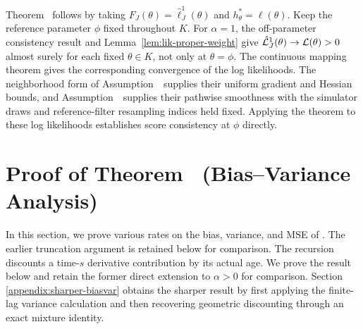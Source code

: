 Theorem~{\thmMopGradConsistency} follows by taking $F_J(\theta)=\hat\ell_J^1(\theta)$ and $h_\theta^*=\ell(\theta)$. Keep the reference parameter $\phi$ fixed throughout $K$. For $\alpha=1$, the off-parameter consistency result and Lemma~\ref{lem:lik-proper-weight} give $\hat{\mathcal{L}}_J^1(\theta)\to\mathcal{L}(\theta)>0$ almost surely for each fixed $\theta\in K$, not only at $\theta=\phi$. The continuous mapping theorem gives the corresponding convergence of the log likelihoods. The neighborhood form of Assumption~\ supplies their uniform gradient and Hessian bounds, and Assumption~\ supplies their pathwise smoothness with the simulator draws and reference-filter resampling indices held fixed. Applying the theorem to these log likelihoods establishes score consistency at $\phi$ directly.


\section[Bias and Variance Bounds for the Discounted Score Estimator]{Proof of Theorem~{\thmMopBiasvar} (Bias--Variance Analysis)}
\label{sec:app07-s6}
\label{appendix:biasvar}


In this section, we prove various rates on the bias, variance, and MSE of . 
The earlier truncation argument is retained below for comparison.  The
 recursion discounts a time-$s$ derivative contribution by its actual
age.  We prove the  result below and retain the former direct
extension to $\alpha>0$ for comparison.  Section~
\ref{appendix:sharper-biasvar} obtains the sharper result by first applying
the finite-lag variance calculation and then recovering geometric
discounting through an exact mixture identity.


